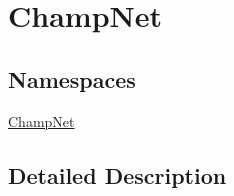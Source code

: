 \hypertarget{group__champnet}{\section{Champ\-Net}
\label{group__champnet}
}
\subsection*{Namespaces}
\begin{DoxyCompactItemize}
\item 
\hyperlink{namespace_champ_net}{Champ\-Net}
\end{DoxyCompactItemize}


\subsection{Detailed Description}
